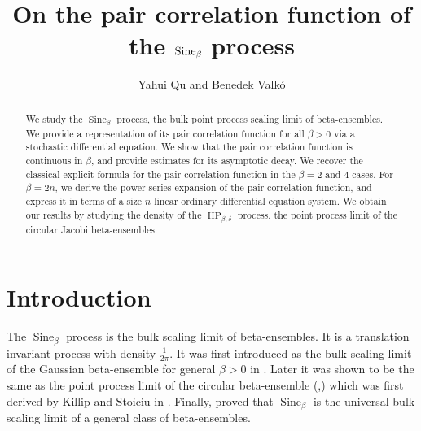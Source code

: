 \documentclass[12pt]{article}
\title{On the pair correlation function of the $\Sineb$ process}
\date{}
\author{Yahui Qu and Benedek Valk\'o}
\theoremstyle{definition} %
\theoremstyle{remark} %
\newcommand{\Sineb}{\operatorname{Sine}_{\beta}}
\newcommand{\HPb}{\operatorname{HP}_{\beta, \delta}}
\newcommand{\CbE}{\mathtt{C}\beta\mathtt{E}}
\begin{document}
\maketitle

\begin{abstract}
We study the $\Sineb$ process, the bulk point process scaling limit of beta-ensembles. We provide a representation of  its pair  correlation function for all $\beta>0$ via a stochastic differential equation. 
We show that the pair correlation function is continuous in $\beta$, and provide estimates for its asymptotic decay.  We
    recover the classical explicit formula for the pair correlation function in the $\beta=2$ and $4$ cases. For  $\beta=2n$, we derive the power series expansion of the pair correlation function, and express it 
    in terms of a size $n$ linear ordinary differential equation system. 
    We obtain our results by studying the density of the  $\HPb$ process, the point process limit of the circular Jacobi beta-ensembles. %
\end{abstract}


\section{Introduction}


The $\Sineb$ process is the bulk scaling limit of beta-ensembles. It is a translation invariant process with density $\tfrac1{2\pi}$. It was first introduced as the bulk scaling limit of the Gaussian beta-ensemble for general $\beta>0$ in \cite{BVBV}. Later it was shown to be the same as the point process limit of the circular beta-ensemble (\cite{BVBV_sbo},\cite{Nakano}) which was first derived by Killip and Stoiciu in \cite{KS}. Finally, \cite{BEY} proved that $\Sineb$ is the universal bulk scaling limit of a general class of beta-ensembles. 
\end{document}
